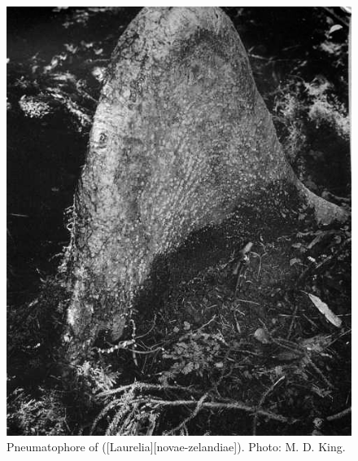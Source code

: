 \begin{figure}[t]
\begin{minipage}[t]{\textwidth}
\begin{minipage}[t]{(\textwidth-\fgap-\fgap) * \real{0.362}}
			\includegraphics[width=\textwidth]{graphics/figure10pukatea.jpg}
			\caption[Pneumatophore of pukatea]{Pneumatophore of  ([Laurelia][novae-zelandiae]).
			Photo:  M. D. King.}%
			\label{fig:10pukatea}
		\end{minipage}\hspace{\fgap}%
		\begin{minipage}[t]{(\textwidth-\fgap-\fgap) * \real{0.295}}
			\centering

\end{minipage}
\end{minipage}
\end{figure}
